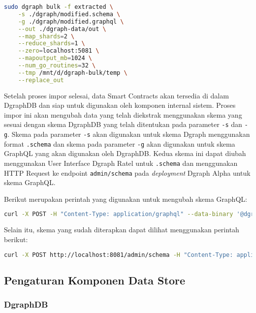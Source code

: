 \begin{lstlisting}[language=bash]
    sudo dgraph bulk -f extracted \
    -s ./dgraph/modified.schema \
    -g ./dgraph/modified.graphql \
    --out ./dgraph-data/out \
    --map_shards=2 \
    --reduce_shards=1 \
    --zero=localhost:5081 \
    --mapoutput_mb=1024 \
    --num_go_routines=32 \
    --tmp /mnt/d/dgraph-bulk/temp \
    --replace_out
\end{lstlisting}

Setelah proses impor selesai, data Smart Contracts akan tersedia di dalam DgraphDB dan siap untuk digunakan oleh komponen internal sistem. Proses impor ini akan mengubah data yang telah diekstrak menggunakan skema yang sesuai dengan skema DgraphDB yang telah ditentukan pada parameter \texttt{-s} dan \texttt{-g}. Skema pada parameter \texttt{-s} akan digunakan untuk skema Dgraph menggunakan format \texttt{.schema} dan skema pada parameter \texttt{-g} akan digunakan untuk skema GraphQL yang akan digunakan oleh DgraphDB. Kedua skema ini dapat diubah menggunakan User Interface Dgraph Ratel untuk \texttt{.schema} dan menggunakan HTTP Request ke endpoint \texttt{admin/schema} pada \textit{deployment} Dgraph Alpha untuk skema GraphQL.

Berikut merupakan perintah yang digunakan untuk mengubah skema GraphQL:

\begin{lstlisting}[language=bash]
    curl -X POST -H "Content-Type: application/graphql" --data-binary '@dgraph/simple.graphql' http://localhost:8081/admin/schema
\end{lstlisting}

Selain itu, skema yang sudah diterapkan dapat dilihat menggunakan perintah berikut:

\begin{lstlisting}[language=bash]
    curl -X POST http://localhost:8081/admin/schema -H "Content-Type: application/json" -d '{"query": "{ getGQLSchema { schema } }"}'
\end{lstlisting}

\subsection{Pengaturan Komponen Data Store}

\subsubsection{DgraphDB}

